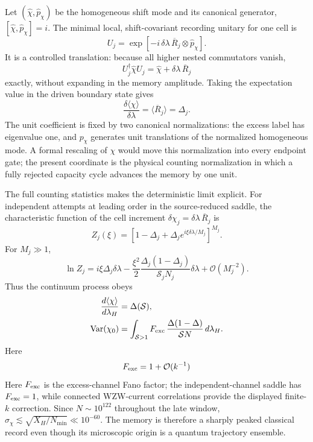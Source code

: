 \documentclass[aps,prd,twocolumn,10pt,superscriptaddress,nofootinbib]{revtex4-2}
\begin{document}
Let $(\widehat\chi,\widehat p_\chi)$ be the homogeneous shift mode and its
canonical generator,
$[\widehat\chi,\widehat p_\chi]=i$.  The minimal local, shift-covariant
recording unitary for one cell is
\begin{equation}
U_j
=\exp[-i\,\delta\lambda\,
       \overline R_j\otimes\widehat p_\chi].
\label{eq:pb_write_unitary}
\end{equation}
It is a controlled translation: because all higher nested commutators
vanish,
\begin{equation}
U_j^\dagger\widehat\chi U_j
=\widehat\chi+\delta\lambda\,\overline R_j
\label{eq:pb_write_shift}
\end{equation}
exactly, without expanding in the memory amplitude.  Taking the expectation
value in the driven boundary state gives
\begin{equation}
\frac{\delta\langle\chi\rangle}{\delta\lambda}
=\langle\overline R_j\rangle
=\Delta_j.
\label{eq:pb_write_mean_discrete}
\end{equation}
The unit coefficient is fixed by two canonical normalizations: the excess
label has eigenvalue one, and $p_\chi$ generates unit translations of the
normalized homogeneous mode.  A formal rescaling of $\chi$ would move this
normalization into every endpoint gate; the present coordinate is the
physical counting normalization in which a fully rejected capacity cycle
advances the memory by one unit.

The full counting statistics makes the deterministic limit explicit.  For
independent attempts at leading order in the source-reduced saddle, the
characteristic function of the cell increment
$\delta\chi_j=\delta\lambda\,\overline R_j$ is
\begin{equation}
Z_j(\xi)
=\left[1-\Delta_j+
\Delta_j e^{i\xi\delta\lambda/M_j}\right]^{M_j}.
\label{eq:pb_write_fcs}
\end{equation}
For $M_j\gg1$,
\begin{equation}
\ln Z_j
=i\xi\Delta_j\delta\lambda
-\frac{\xi^2}{2}
 \frac{\Delta_j(1-\Delta_j)}{\mathcal S_jN_j}
 \delta\lambda
+\mathcal O(M_j^{-2}).
\label{eq:pb_write_fcs_expand}
\end{equation}
Thus the continuum process obeys
\begin{align}
\frac{d\langle\chi\rangle}{d\lambda_H}
&=\Delta(\mathcal S),
\label{eq:pb_write_law}\\
\mathrm{Var}(\chi_0)
&=\int_{\mathcal S>1}
F_{\rm exc}\,
\frac{\Delta(1-\Delta)}{\mathcal S N}\,d\lambda_H.
\label{eq:pb_write_variance}
\end{align}
Here
\begin{equation}
F_{\rm exc}=1+\mathcal O(k^{-1})
\label{eq:pb_write_fano}
\end{equation}
Here $F_{\rm exc}$ is the excess-channel Fano factor; the independent-channel
saddle has $F_{\rm exc}=1$, while connected WZW-current correlations provide
the displayed finite-$k$ correction.  Since $N\sim10^{122}$ throughout the late window,
$\sigma_\chi\lesssim\sqrt{X_H/N_{\min}}\ll10^{-60}$.  The memory is
therefore a sharply peaked classical record even though its microscopic
origin is a quantum trajectory ensemble.
\end{document}

